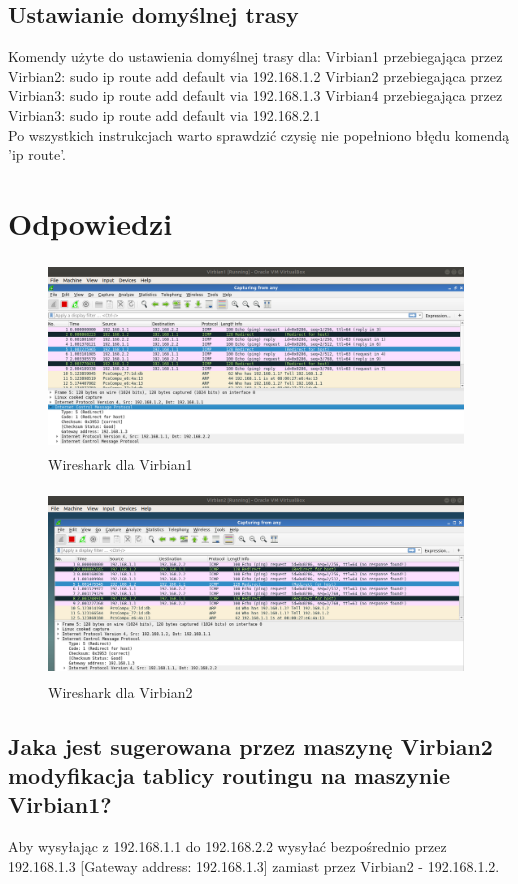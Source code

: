 \documentclass{article}
\begin{document}
\subsection{Ustawianie domyślnej trasy}
Komendy użyte do ustawienia domyślnej trasy dla:
\tabto{0.4cm}Virbian1 przebiegająca przez Virbian2:
\tabto{0.8cm}    sudo ip route add default via 192.168.1.2
\tabto{0.4cm}Virbian2 przebiegająca przez Virbian3:
\tabto{0.8cm}    sudo ip route add default via 192.168.1.3
\tabto{0.4cm}Virbian4 przebiegająca przez Virbian3:
\tabto{0.8cm}    sudo ip route add default via 192.168.2.1
\\
Po wszystkich instrukcjach warto sprawdzić czysię nie popełniono błędu komendą 'ip route'.

\section{Odpowiedzi}

\begin{figure}[!htb]
\centering
\includegraphics[width=11cm,height=5cm]{v1.png}
\caption{Wireshark dla Virbian1}
\end{figure}

\begin{figure}[!htb]
\centering
\includegraphics[width=11cm,height=5cm]{v2.png}
\caption{Wireshark dla Virbian2}
\end{figure}
\subsection{Jaka jest sugerowana przez maszynę Virbian2 modyfikacja tablicy routingu na maszynie Virbian1?}
Aby wysyłając z 192.168.1.1 do 192.168.2.2 wysyłać bezpośrednio przez 192.168.1.3 [Gateway address: 192.168.1.3] zamiast przez Virbian2 - 192.168.1.2.
\end{document}
